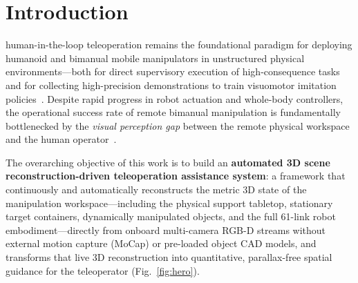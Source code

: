 \documentclass[10pt,journal]{IEEEtran}
\begin{document}
\section{Introduction}
\label{sec:intro}

 human-in-the-loop teleoperation remains the foundational paradigm for deploying humanoid and bimanual mobile manipulators in unstructured physical environments---both for direct supervisory execution of high-consequence tasks and for collecting high-precision demonstrations to train visuomotor imitation policies~\cite{chen2007human,rea2022still,billard2019trends,chi2023diffusion,zhao2023learning,sheridan1992telerobotics,fu2024mobile,qin2023anyteleop,pi2026pi07}. Despite rapid progress in robot actuation and whole-body controllers, the operational success rate of remote bimanual manipulation is fundamentally bottlenecked by the \emph{visual perception gap} between the remote physical workspace and the human operator~\cite{chen2007human,rea2022still,milgram1993argos,rakita2018autonomous,rosenberg1993virtual,bowyer2013active,su2021mixed,schwarz2017nimbro}.

The overarching objective of this work is to build an \textbf{automated 3D scene reconstruction-driven teleoperation assistance system}: a framework that continuously and automatically reconstructs the metric 3D state of the manipulation workspace---including the physical support tabletop, stationary target containers, dynamically manipulated objects, and the full 61-link robot embodiment---directly from onboard multi-camera RGB-D streams without external motion capture (MoCap) or pre-loaded object CAD models, and transforms that live 3D reconstruction into quantitative, parallax-free spatial guidance for the teleoperator (Fig.~\ref{fig:hero}).
\end{document}
